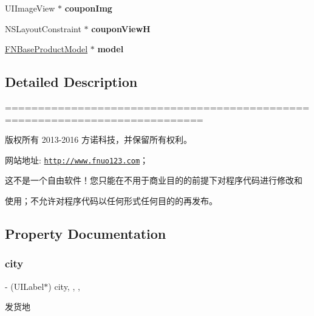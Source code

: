 \begin{DoxyCompactItemize}
U\+I\+Image\+View $\ast$ {\bfseries coupon\+Img}
\item 
\mbox{\label{interface_product_collection_view_cell_a1e0fec90382045b415d7c7f87016a4ed}} 
N\+S\+Layout\+Constraint $\ast$ {\bfseries coupon\+ViewH}
\item 
\mbox{\label{interface_product_collection_view_cell_a73178b50b4b084e0be3412f44e4e97fc}} 
\mbox{\hyperlink{interface_f_n_base_product_model}{F\+N\+Base\+Product\+Model}} $\ast$ {\bfseries model}
\end{DoxyCompactItemize}


\subsection{Detailed Description}
============================================================================

版权所有 2013-\/2016 方诺科技，并保留所有权利。

网站地址\+: \href{http://www.fnuo123.com}{\tt http\+://www.\+fnuo123.\+com}； 



这不是一个自由软件！您只能在不用于商业目的的前提下对程序代码进行修改和

使用；不允许对程序代码以任何形式任何目的的再发布。 

 

\subsection{Property Documentation}
\mbox{\label{interface_product_collection_view_cell_a2f8a705886db9a557e69038618653eab}} 
\subsubsection{\texorpdfstring{city}{city}}
{\footnotesize\ttfamily -\/ (U\+I\+Label$\ast$) city\hspace{0.3cm}{\ttfamily [read]}, {\ttfamily [write]}, {\ttfamily [nonatomic]}, {\ttfamily [strong]}}

发货地 \mbox{\label{interface_product_collection_view_cell_a0b00dd3cdefce4548ea46fd5fd7a0a89}} 
